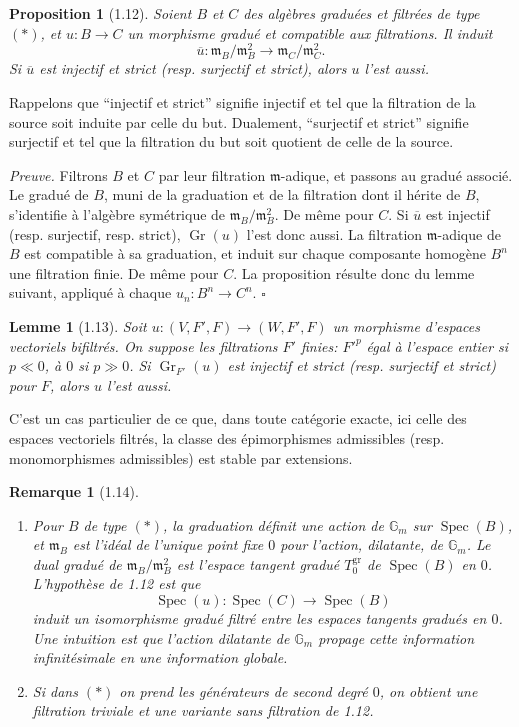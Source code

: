 \documentclass[10pt,a4paper]{article}
\newcommand{\Gm}{\mathbb G_m}
\newcommand{\Spec}{\operatorname{Spec}}
\newcommand{\Gr}{\operatorname{Gr}}
\newcommand{\m}{\mathfrak m}
\theoremstyle{deligne}
\newtheorem*{proposition*}{Proposition}
\newtheorem*{lemma*}{Lemme}
\newtheorem*{remark*}{Remarque}
\newenvironment{proofdel}{\textit{Preuve.}}{\hfill$\square$}
\begin{document}
\begin{proposition*}[1.12]
Soient \(B\) et \(C\) des algèbres graduées et filtrées de type \((*)\), et \(u:B\to C\) un morphisme gradué et compatible aux filtrations. Il induit
\[
\overline u:\m_B/\m_B^2\longrightarrow \m_C/\m_C^2.
\]
Si \(\overline u\) est injectif et strict (resp. surjectif et strict), alors \(u\) l'est aussi.
\end{proposition*}

Rappelons que ``injectif et strict'' signifie injectif et tel que la filtration de la source soit induite par celle du but. Dualement, ``surjectif et strict'' signifie surjectif et tel que la filtration du but soit quotient de celle de la source.

\begin{proofdel}
Filtrons \(B\) et \(C\) par leur filtration \(\m\)-adique, et passons au gradué associé. Le gradué de \(B\), muni de la graduation et de la filtration dont il hérite de \(B\), s'identifie à l'algèbre symétrique de \(\m_B/\m_B^2\). De même pour \(C\). Si \(\overline u\) est injectif (resp. surjectif, resp. strict), \(\Gr(u)\) l'est donc aussi. La filtration \(\m\)-adique de \(B\) est compatible à sa graduation, et induit sur chaque composante homogène \(B^n\) une filtration finie. De même pour \(C\). La proposition résulte donc du lemme suivant, appliqué à chaque \(u_n:B^n\to C^n\).
\end{proofdel}

\begin{lemma*}[1.13]
Soit \(u:(V,F',F)\to(W,F',F)\) un morphisme d'espaces vectoriels bifiltrés. On suppose les filtrations \(F'\) finies: \(F'^p\) égal à l'espace entier si \(p\ll0\), à \(0\) si \(p\gg0\). Si \(\Gr_{F'}(u)\) est injectif et strict (resp. surjectif et strict) pour \(F\), alors \(u\) l'est aussi.
\end{lemma*}

C'est un cas particulier de ce que, dans toute catégorie exacte, ici celle des espaces vectoriels filtrés, la classe des épimorphismes admissibles (resp. monomorphismes admissibles) est stable par extensions.

\begin{remark*}[1.14]
\begin{enumerate}[label=(\roman*)]
\item Pour \(B\) de type \((*)\), la graduation définit une action de \(\Gm\) sur \(\Spec(B)\), et \(\m_B\) est l'idéal de l'unique point fixe \(0\) pour l'action, dilatante, de \(\Gm\). Le dual gradué de \(\m_B/\m_B^2\) est l'espace tangent gradué \(T^{\mathrm{gr}}_0\) de \(\Spec(B)\) en \(0\). L'hypothèse de 1.12 est que
\[
\Spec(u):\Spec(C)\longrightarrow\Spec(B)
\]
induit un isomorphisme gradué filtré entre les espaces tangents gradués en \(0\). Une intuition est que l'action dilatante de \(\Gm\) propage cette information infinitésimale en une information globale.
\item Si dans \((*)\) on prend les générateurs de second degré \(0\), on obtient une filtration triviale et une variante sans filtration de 1.12.
\end{enumerate}
\end{remark*}
\end{document}
